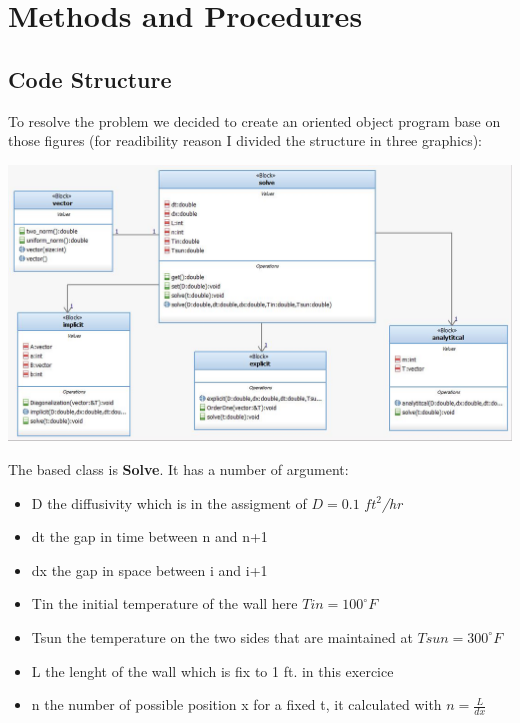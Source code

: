 \documentclass [10 pt, a4 paper]{article}
\begin{document}
\newpage


\section{Methods and Procedures}

\subsection{Code Structure}

    To resolve the problem we decided to create an oriented object program base on 
those figures (for readibility reason I divided the structure in three graphics):
\begin{center}
    \includegraphics[scale=0.6]{Chart/General.JPG}
\end{center}
The based class is \textbf{Solve}. It has a number of argument:
\begin{itemize}
    \item D the diffusivity which is in the assigment of $D = 0.1$  \textit{$ft^{2}$/hr}
    \item dt the gap in time between n and n+1
    \item dx the gap in space between i and i+1
    \item Tin the initial temperature of the wall here $Tin = 100^{\circ}F$
    \item Tsun the temperature on the two sides that are maintained at $Tsun = 300^{\circ}F$
    \item L the lenght of the wall which is fix to 1 ft. in this exercice
    \item n the number of possible position x for a fixed t, it calculated with $n = \frac{L}{dx}$
\end{itemize}
\end{document}

